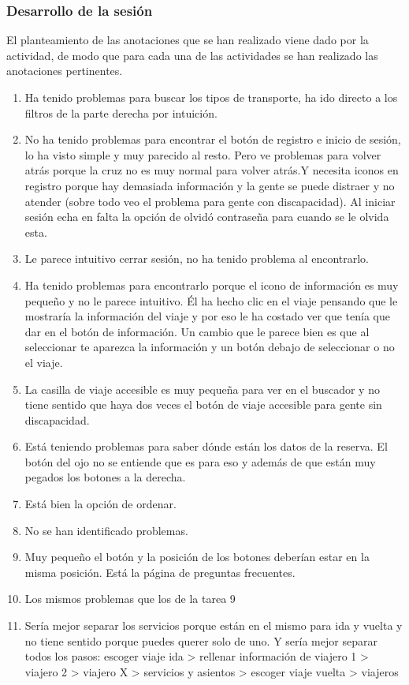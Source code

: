 \subsubsection{Desarrollo de la sesión}
El planteamiento de las anotaciones que se han realizado viene dado por la actividad, de modo que para cada una de las actividades se han realizado las anotaciones pertinentes.
\begin{enumerate}
    \item Ha tenido problemas para buscar los tipos de transporte, ha ido directo a los filtros de la parte derecha por intuición.
    \item No ha tenido problemas para encontrar el botón de registro e inicio de sesión, lo ha visto simple y muy parecido al resto. Pero ve problemas para volver atrás porque la cruz no es muy normal para volver atrás.Y necesita iconos en registro porque hay demasiada información y la gente se puede distraer y no atender (sobre todo veo el problema para gente con discapacidad). Al iniciar sesión echa en falta la opción de olvidó contraseña para cuando se le olvida esta.
    \item Le parece intuitivo cerrar sesión, no ha tenido problema al encontrarlo.
    \item Ha tenido problemas para encontrarlo porque el icono de información es muy pequeño y no le parece intuitivo. Él ha hecho clic en el viaje pensando que le mostraría la información del viaje y por eso le ha costado ver que tenía que dar en el botón de información. Un cambio que le parece bien es que al seleccionar te aparezca la información y un botón debajo de seleccionar o no el viaje.
    \item La casilla de viaje accesible es muy pequeña para ver en el buscador y no tiene sentido que haya dos veces el botón de viaje accesible para gente sin discapacidad.
    \item Está teniendo problemas para saber dónde están los datos de la reserva. El botón del ojo no se entiende que es para eso y además de que están muy pegados los botones a la derecha.
    \item Está bien la opción de ordenar.
    \item No se han identificado problemas.
    \item Muy pequeño el botón y la posición de los botones deberían estar en la misma posición. Está la página de preguntas frecuentes.
    \item Los mismos problemas que los de la tarea 9
    \item Sería mejor separar los servicios porque están en el mismo para ida y vuelta y no tiene sentido porque puedes querer solo de uno. Y sería mejor separar todos los pasos: escoger viaje ida > rellenar información de viajero 1 > viajero 2 > viajero X > servicios y asientos > escoger viaje vuelta > viajeros 

\end{enumerate}
